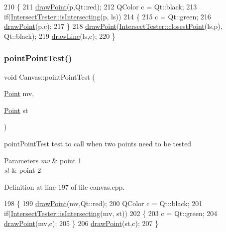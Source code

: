 \begin{DoxyCode}
210 \{
211     \hyperlink{class_canvas_ad7cf8e6e93765586808ac744d888dbdc}{drawPoint}(p,Qt::red);
212     QColor c = Qt::black;
213     \textcolor{keywordflow}{if}(\hyperlink{class_intersect_tester_a7710e17ff7d2e229059f23b9429213f5}{IntersectTester::isIntersecting}(p, ls))
214     \{
215         c = Qt::green;
216         \hyperlink{class_canvas_ad7cf8e6e93765586808ac744d888dbdc}{drawPoint}(p,c);
217     \}
218     \hyperlink{class_canvas_ad7cf8e6e93765586808ac744d888dbdc}{drawPoint}(\hyperlink{class_intersect_tester_a6bb20d4839643fbfd53a5d4506448a92}{IntersectTester::closestPoint}(ls,p), Qt::black);
219     \hyperlink{class_canvas_ae3ad5d92c9a2868b94a6570914b05366}{drawLine}(ls,c);
220 \}
\end{DoxyCode}
\mbox{\label{class_canvas_a33b608940212192e7e0ff86c2301c2fe}} 
\subsubsection{\texorpdfstring{point\+Point\+Test()}{pointPointTest()}}
{\footnotesize\ttfamily void Canvas\+::point\+Point\+Test (\begin{DoxyParamCaption}\item[{\hyperlink{class_point}{Point}}]{mv,  }\item[{\hyperlink{class_point}{Point}}]{st }\end{DoxyParamCaption})\hspace{0.3cm}{\ttfamily [private]}}



point\+Point\+Test test to call when two points need to be tested 


\begin{DoxyParams}{Parameters}
{\em mv} & point 1 \\
\hline
{\em st} & point 2 \\
\hline
\end{DoxyParams}


Definition at line 197 of file canvas.\+cpp.


\begin{DoxyCode}
198 \{
199     \hyperlink{class_canvas_ad7cf8e6e93765586808ac744d888dbdc}{drawPoint}(mv,Qt::red);
200     QColor c = Qt::black;
201     \textcolor{keywordflow}{if}(\hyperlink{class_intersect_tester_a7710e17ff7d2e229059f23b9429213f5}{IntersectTester::isIntersecting}(mv, st))
202     \{
203         c = Qt::green;
204         \hyperlink{class_canvas_ad7cf8e6e93765586808ac744d888dbdc}{drawPoint}(mv,c);
205     \}
206     \hyperlink{class_canvas_ad7cf8e6e93765586808ac744d888dbdc}{drawPoint}(st,c);
207 \}
\end{DoxyCode}
\mbox{\label{class_canvas_ac9278bae8055ec5b0f047393d2f140b2}} 
